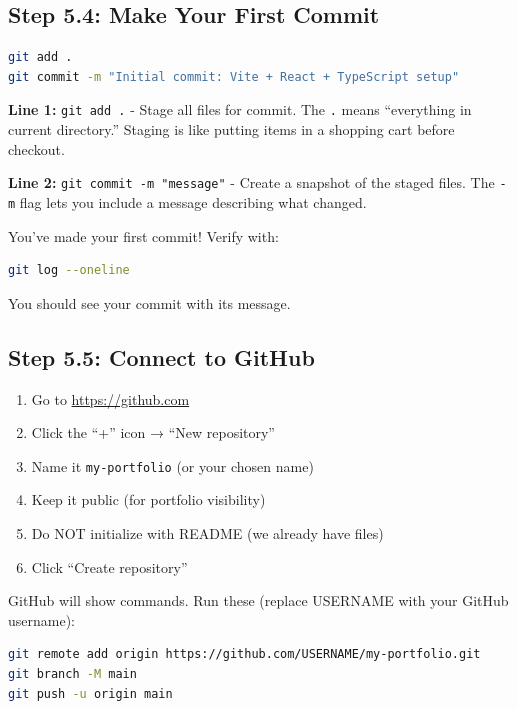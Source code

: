 \documentclass[12pt,a4paper]{article}
\begin{document}
\subsection{Step 5.4: Make Your First Commit}

\begin{lstlisting}[language=bash,caption={Stage and commit all files}]
git add .
git commit -m "Initial commit: Vite + React + TypeScript setup"
\end{lstlisting}

\begin{explanation}
\textbf{Line 1:} \texttt{git add .} - Stage all files for commit. The \texttt{.} means ``everything in current directory.'' Staging is like putting items in a shopping cart before checkout.

\textbf{Line 2:} \texttt{git commit -m "message"} - Create a snapshot of the staged files. The \texttt{-m} flag lets you include a message describing what changed.
\end{explanation}

\begin{gitcommit}
You've made your first commit! Verify with:
\begin{lstlisting}[language=bash]
git log --oneline
\end{lstlisting}
You should see your commit with its message.
\end{gitcommit}

\subsection{Step 5.5: Connect to GitHub}

\begin{enumerate}
    \item Go to \url{https://github.com}
    \item Click the ``+'' icon → ``New repository''
    \item Name it \texttt{my-portfolio} (or your chosen name)
    \item Keep it public (for portfolio visibility)
    \item Do NOT initialize with README (we already have files)
    \item Click ``Create repository''
\end{enumerate}

GitHub will show commands. Run these (replace USERNAME with your GitHub username):

\begin{lstlisting}[language=bash,caption={Connect local repo to GitHub}]
git remote add origin https://github.com/USERNAME/my-portfolio.git
git branch -M main
git push -u origin main
\end{lstlisting}
\end{document}
